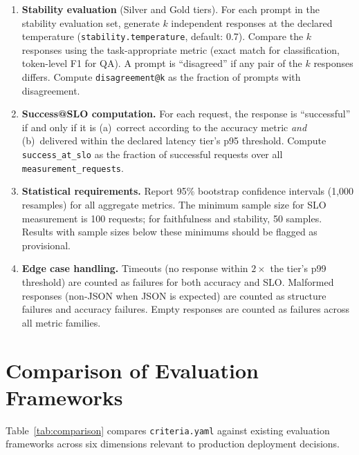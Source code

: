\documentclass[11pt]{article}
\newcommand{\criteriayaml}{\texttt{criteria.yaml}}
\begin{document}
\begin{enumerate}[leftmargin=16pt]
  \item \textbf{Stability evaluation} (Silver and Gold tiers). For each prompt in the stability evaluation set, generate $k$ independent responses at the declared temperature (\texttt{stability.temperature}, default: 0.7). Compare the $k$ responses using the task-appropriate metric (exact match for classification, token-level F1 for QA). A prompt is ``disagreed'' if any pair of the $k$ responses differs. Compute \texttt{disagreement@k} as the fraction of prompts with disagreement.

  \item \textbf{Success@SLO computation.} For each request, the response is ``successful'' if and only if it is (a)~correct according to the accuracy metric \emph{and} (b)~delivered within the declared latency tier's p95 threshold. Compute \texttt{success\_at\_slo} as the fraction of successful requests over all \texttt{measurement\_requests}.

  \item \textbf{Statistical requirements.} Report 95\% bootstrap confidence intervals (1,000 resamples) for all aggregate metrics. The minimum sample size for SLO measurement is 100 requests; for faithfulness and stability, 50 samples. Results with sample sizes below these minimums should be flagged as provisional.

  \item \textbf{Edge case handling.} Timeouts (no response within $2\times$ the tier's p99 threshold) are counted as failures for both accuracy and SLO. Malformed responses (non-JSON when JSON is expected) are counted as structure failures and accuracy failures. Empty responses are counted as failures across all metric families.
\end{enumerate}


\section{Comparison of Evaluation Frameworks}
\label{app:comparison}

Table~\ref{tab:comparison} compares \criteriayaml{} against existing evaluation frameworks across six dimensions relevant to production deployment decisions.
\end{document}
